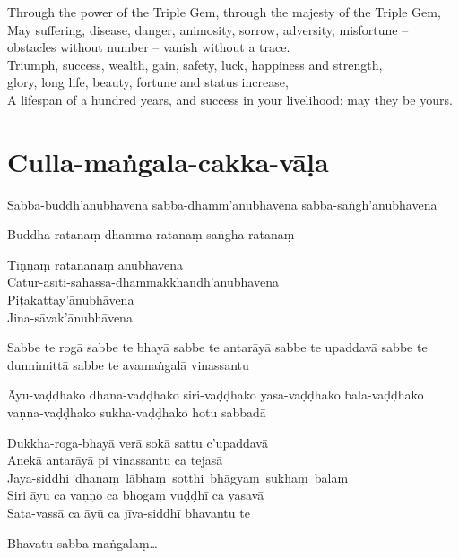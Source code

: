 \begin{english}
  Through the power of the Triple Gem, through the majesty of the Triple Gem,\\
  May suffering, disease, danger, animosity, sorrow, adversity, misfortune --\\
  obstacles without number -- vanish without a trace.\\
  Triumph, success, wealth, gain, safety, luck, happiness and strength,\\
  glory, long life, beauty, fortune and status increase,\\
  A lifespan of a hundred years, and success in your livelihood: may they be yours.
\end{english}

\section{Culla-maṅgala-cakka-vāḷa}


Sabba-buddh'ānubhāvena sabba-dhamm'ānubhāvena sabba-saṅgh'ānubhāvena

Buddha-ratanaṃ dhamma-ratanaṃ saṅgha-ratanaṃ

Tiṇṇaṃ ratanānaṃ ānubhāvena\\
Catur-āsīti-sahassa-dhammakkhandh'ānubhāvena\\
Piṭakattay'ānubhāvena\\
Jina-sāvak'ānubhāvena

Sabbe te rogā sabbe te bhayā sabbe te antarāyā sabbe te upaddavā sabbe te
dunnimittā sabbe te avamaṅgalā vinassantu

Āyu-vaḍḍhako dhana-vaḍḍhako siri-vaḍḍhako yasa-vaḍḍhako bala-vaḍḍhako
vaṇṇa-vaḍḍhako sukha-vaḍḍhako hotu sabbadā

Dukkha-roga-bhayā verā sokā sattu c'upaddavā\\
Anekā antarāyā pi vinassantu ca tejasā\\
\mbox{Jaya-siddhi dhanaṃ lābhaṃ sotthi bhāgyaṃ sukhaṃ balaṃ}\\
Siri āyu ca vaṇṇo ca bhogaṃ vuḍḍhī ca yasavā\\
Sata-vassā ca āyū ca jīva-siddhī bhavantu te

Bhavatu sabba-maṅgalaṃ\ldots{}

